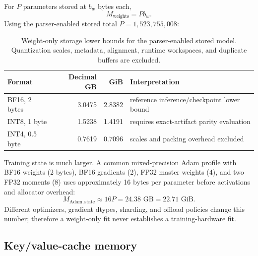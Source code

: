 \documentclass[10pt,letterpaper]{article}
\newcommand{\1}{\mathbb{1}}
\begin{document}
For $P$ parameters stored at $b_w$ bytes each,
\begin{equation}
  M_{\mathrm{weights}}=Pb_w.
  \label{eq:weight-memory}
\end{equation}
Using the parser-enabled stored total $P=1{,}523{,}755{,}008$:
\begin{table}[h]
\centering
\caption{Weight-only storage lower bounds for the parser-enabled stored model.  Quantization scales,
metadata, alignment, runtime workspaces, and duplicate buffers are excluded.}
\label{tab:weight-storage}
\small
\begin{tabular}{@{}lrrl@{}}
\toprule
Format & Decimal GB & GiB & Interpretation \\
\midrule
BF16, 2 bytes & 3.0475 & 2.8382 & reference inference/checkpoint lower bound \\
INT8, 1 byte & 1.5238 & 1.4191 & requires exact-artifact parity evaluation \\
INT4, 0.5 byte & 0.7619 & 0.7096 & scales and packing overhead excluded \\
\bottomrule
\end{tabular}
\end{table}

Training state is much larger.  A common mixed-precision Adam profile with BF16 weights (2 bytes),
BF16 gradients (2), FP32 master weights (4), and two FP32 moments (8) uses approximately 16 bytes per
parameter before activations and allocator overhead:
\begin{equation}
  M_{\mathrm{Adam,state}}\approx16P
  =24.38\text{ GB}=22.71\text{ GiB}.
  \label{eq:adam-memory}
\end{equation}
Different optimizers, gradient dtypes, sharding, and offload policies change this number; therefore a
weight-only fit never establishes a training-hardware fit.

\subsection{Key/value-cache memory}
\end{document}
